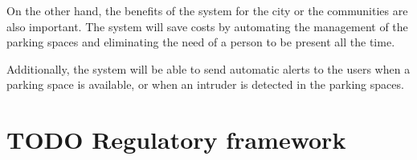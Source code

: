 \documentclass[oneside, 12pt, a4paper, draft]{book}
\begin{document}
On the other hand, the benefits of the system for the city or the communities are also important. The system will save costs by automating the management of the parking spaces and eliminating the need of a person to be present all the time.

Additionally, the system will be able to send automatic alerts to the users when a parking space is available, or when an intruder is detected in the parking spaces.
\chapter{{\bfseries\sffamily TODO} Regulatory framework}
\label{sec:orgf3d321e}
\printbibliography
{} %
\end{document}
